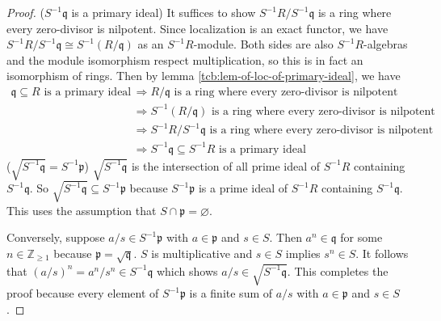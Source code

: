\documentclass[a4paper,10pt]{article}
\theoremstyle{definition}
\newcommand\lref[2][blue!60!black]{lemma \ref{tcb:#2}}
\newcommand\cbox[1]{\colorbox{gray!20}{#1}}
\renewcommand\geq{\geqslant}
\begin{document}
\begin{proof}
\cbox{($S^{-1}\mathfrak{q}$ is a primary ideal)}
It suffices to show $S^{-1}R/S^{-1}\mathfrak{q}$ is a 
ring where every zero-divisor is nilpotent.
Since localization is an exact functor, we have 
$S^{-1}R/S^{-1}\mathfrak{q}\cong S^{-1}(R/\mathfrak{q})$
as an $S^{-1}R$-module.
Both sides are also $S^{-1}R$-algebras and the module isomorphism 
respect multiplication, so this is in fact an isomorphism of rings.
Then by \lref{lem-of-loc-of-primary-ideal}, we have 
\begin{equation*}\begin{split}
\mathfrak{q}\subseteq R\text{ is a primary ideal}&\Longrightarrow
R/\mathfrak{q}\text{ is a ring where every zero-divisor is nilpotent}\\
&\Longrightarrow S^{-1}(R/\mathfrak{q})\text{ is a ring where every zero-divisor is nilpotent}\\
&\Longrightarrow S^{-1}R/S^{-1}\mathfrak{q}\text{ is a ring where every zero-divisor is nilpotent}\\
&\Longrightarrow S^{-1}\mathfrak{q}\subseteq S^{-1}R\text{ is a primary ideal}
\end{split}\end{equation*}
\cbox{($\sqrt{S^{-1}\mathfrak{q}}=S^{-1}\mathfrak{p}$)}
$\sqrt{S^{-1}\mathfrak{q}}$ is the intersection of all prime ideal 
of $S^{-1}R$ containing $S^{-1}\mathfrak{q}$.
So $\sqrt{S^{-1}\mathfrak{q}}\subseteq S^{-1}\mathfrak{p}$ because 
$S^{-1}\mathfrak{p}$ is a prime ideal of $S^{-1}R$ 
containing $S^{-1}\mathfrak{q}$.
This uses the assumption that $S\cap\mathfrak{p}=\varnothing$.

Conversely, suppose $a/s\in S^{-1}\mathfrak{p}$
with $a\in\mathfrak{p}$ and $s\in S$.
Then $a^n\in\mathfrak{q}$ for some $n\in\mathbb{Z}_{\geq1}$
because $\mathfrak{p}=\sqrt{\mathfrak{q}}$.
$S$ is multiplicative and $s\in S$ implies $s^n\in S$.
It follows that $(a/s)^n=a^n/s^n\in S^{-1}\mathfrak{q}$
which shows $a/s\in\sqrt{S^{-1}\mathfrak{q}}$.
This completes the proof because every element of $S^{-1}\mathfrak{p}$
is a finite sum of $a/s$ with $a\in\mathfrak{p}$ and $s\in S$.
\end{proof}
\end{document}
